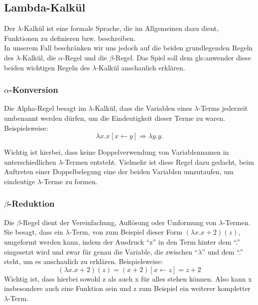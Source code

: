 \documentclass{scrartcl}
\begin{document}
\subsection{Lambda-Kalkül}  \label{subsection:LambdaKalkül}
\label{LambdaKalkül:AlgemeineErklärung}
\begin{minipage}{1\textwidth}
 Der $\lambda$-Kalkül ist eine formale Sprache, die im Allgemeinen dazu dient, Funktionen zu definieren bzw. beschreiben.\\
In unserem Fall beschränken wir uns jedoch auf die beiden grundlegenden Regeln des $\lambda$-Kalkül, die $\alpha$-Regel und die $\beta$-Regel. Das Spiel soll dem \gls{gls:anwender} diese beiden wichtigen Regeln des $\lambda$-Kalkül anschaulich erklären.

\subsubsection{\texorpdfstring{$\alpha$}{Alpha}-Konversion}

Die Alpha-Regel besagt im $\lambda$-Kalkül, dass die Variablen eines $\lambda$-Terms jederzeit umbenannt werden dürfen, um die Eindeutigkeit dieser Terme zu waren. Beispielsweise:
\[
	\lambda x.x [x \leftarrow y] \Rightarrow \lambda y.y.
\]

Wichtig ist hierbei, dass keine Doppelverwendung von Variablennamen in unterschiedlichen $\lambda$-Termen entsteht. Vielmehr ist diese Regel dazu gedacht, beim Auftreten einer Doppelbelegung eine der beiden Variablen umzutaufen, um eindeutige $\lambda$-Terme zu formen.

\subsubsection{\texorpdfstring{$\beta$}{Beta}-Reduktion}

Die $\beta$-Regel dient der Vereinfachung, Auflösung oder Umformung von $\lambda$-Termen.\\
Sie besagt, dass ein $\lambda$-Term, von zum Beispiel dieser Form $(\lambda x.x+2)(z)$, umgeformt werden kann, indem der Ausdruck ``z'' in den Term hinter dem ``.'' eingesetzt wird und zwar für genau die Variable, die zwischen ``$\lambda$'' und dem ``.'' steht, um es anschaulich zu erklären. Beispielsweise:
\[
	(\lambda x.x+2)(z) = (x+2)[x \leftarrow z] = z + 2
\]
Wichtig ist, dass hierbei sowohl z als auch x für alles stehen können. Also kann x insbesondere auch eine Funktion sein und z zum Beispiel ein weiterer kompletter $\lambda$-Term.


\end{minipage}
\end{document}
